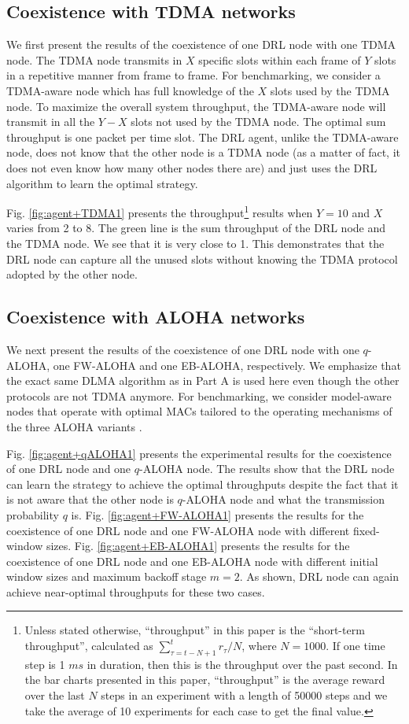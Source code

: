 \documentclass[journal,comsoc]{IEEEtran}
\begin{document}
\subsection{Coexistence with TDMA networks}
We first present the results of the coexistence of one DRL node with one TDMA node. The TDMA node transmits in $ X $  specific slots within each frame of $ Y $ slots in a repetitive manner from frame to frame. For benchmarking, we consider a TDMA-aware node which has full knowledge of the  $ X $ slots used by the TDMA node. To maximize the overall system throughput, the TDMA-aware node will transmit in all the $ Y-X $  slots not used by the TDMA node. The optimal sum throughput is one packet per time slot. The DRL agent, unlike the TDMA-aware node, does not know that the other node is a TDMA node (as a matter of fact, it does not even know how many other nodes there are) and just uses the DRL algorithm to learn the optimal strategy.

Fig. \ref{fig:agent+TDMA1} presents the throughput\footnote{Unless stated otherwise, ``throughput'' in this paper is the ``short-term throughput'', calculated as  $\sum\nolimits_{\tau  = t - N + 1}^t {{r_\tau }/N} $, where  $ N=1000 $. If one time step is 1 $ ms $ in duration, then this is the throughput over the past second. In the bar charts presented in this paper, ``throughput'' is the average reward over the last $ N $ steps in an experiment with a length of 50000 steps and we take the average of 10 experiments for each case to get the final value.} results when  $ Y=10 $ and $ X $ varies from 2 to 8. The green line is the sum throughput of the DRL node and the TDMA node. We see that it is very close to 1. This demonstrates that the DRL node can capture all the unused slots without knowing the TDMA protocol adopted by the other node. 
\subsection{Coexistence with ALOHA networks}
We next present the results of the coexistence of one DRL node with one  $ q $-ALOHA, one FW-ALOHA and one EB-ALOHA, respectively. We emphasize that the exact same DLMA algorithm as in Part A is used here even though the other protocols are not TDMA anymore.  For benchmarking, we consider model-aware nodes that operate with optimal MACs tailored to the operating mechanisms of the three ALOHA variants \cite{benchmark}.

Fig. \ref{fig:agent+qALOHA1} presents the experimental results for the coexistence of one DRL node and one  $ q $-ALOHA node. The results show that the DRL node can learn the strategy to achieve the optimal throughputs despite the fact that it is not aware that the other node is  $ q $-ALOHA node and what the transmission probability $ q $ is. Fig. \ref{fig:agent+FW-ALOHA1} presents the results for the coexistence of one DRL node and one FW-ALOHA node  with different fixed-window sizes. Fig. \ref{fig:agent+EB-ALOHA1} presents the results  for the coexistence of one DRL node and one EB-ALOHA node with different initial window sizes and maximum backoff stage $ m=2 $. As shown, DRL node can again achieve near-optimal throughputs for these two cases. 
\end{document}

